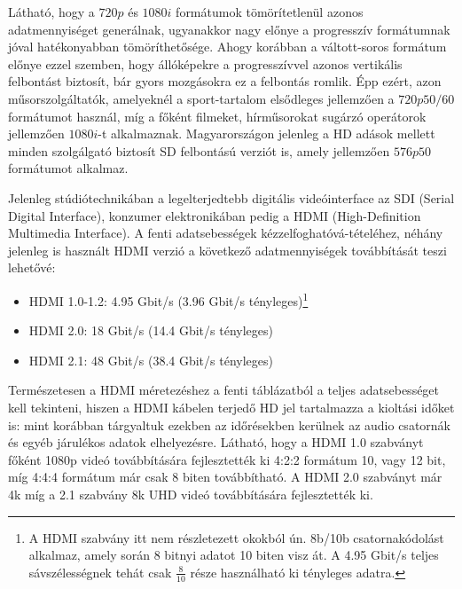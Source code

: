 %
Látható, hogy a $720p$ és $1080i$ formátumok tömörítetlenül azonos adatmennyiséget generálnak, ugyanakkor nagy előnye a progresszív formátumnak jóval hatékonyabban tömöríthetősége.
Ahogy korábban a váltott-soros formátum előnye ezzel szemben, hogy állóképekre a progresszívvel azonos vertikális felbontást biztosít, bár gyors mozgásokra ez a felbontás romlik.
Épp ezért, azon műsorszolgáltatók, amelyeknél a sport-tartalom elsődleges jellemzően a $720p50/60$ formátumot használ, míg a főként filmeket, hírműsorokat sugárzó operátorok jellemzően $1080i$-t alkalmaznak.
Magyarországon jelenleg a HD adások mellett minden szolgálgató biztosít SD felbontású verziót is, amely jellemzően $576p50$ formátumot alkalmaz.

Jelenleg stúdiótechnikában a legelterjedtebb digitális videóinterface az SDI (Serial Digital Interface), konzumer elektronikában pedig a HDMI (High-Definition Multimedia Interface).
A fenti adatsebességek kézzelfoghatóvá-tételéhez, néhány jelenleg is használt HDMI verzió a következő adatmennyiségek továbbítását teszi lehetővé:
\begin{itemize}
\item HDMI 1.0-1.2: 4.95 Gbit/s (3.96 Gbit/s tényleges)\footnote{A HDMI szabvány itt nem részletezett okokból ún. 8b/10b csatornakódolást alkalmaz, amely során 8 bitnyi adatot 10 biten visz át.
A 4.95 Gbit/s teljes sávszélességnek tehát csak $\frac{8}{10}$ része használható ki tényleges adatra.}
\item HDMI 2.0: 18 Gbit/s (14.4 Gbit/s tényleges)
\item HDMI 2.1: 48 Gbit/s (38.4 Gbit/s tényleges)
\end{itemize}
Természetesen a HDMI méretezéshez a fenti táblázatból a teljes adatsebességet kell tekinteni, hiszen a HDMI kábelen terjedő HD jel tartalmazza a kioltási időket is: mint korábban tárgyaltuk ezekben az időrésekben kerülnek az audio csatornák és egyéb járulékos adatok elhelyezésre.
Látható, hogy a HDMI 1.0 szabványt főként 1080p videó továbbítására fejlesztették ki 4:2:2 formátum 10, vagy 12 bit, míg 4:4:4 formátum már csak 8 biten továbbítható.
A HDMI 2.0 szabványt már 4k míg a 2.1 szabvány 8k UHD videó továbbítására fejlesztették ki.



